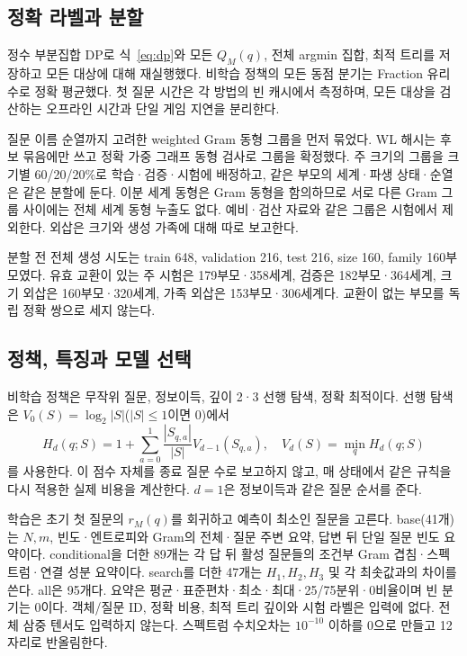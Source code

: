 \documentclass[11pt,a4paper]{article}
\theoremstyle{definition}
\theoremstyle{remark}\newtheorem{remark}[theorem]{주석}
\begin{document}
\subsection{정확 라벨과 분할}
정수 부분집합 DP로 식~\eqref{eq:dp}와 모든 $Q_M(q)$, 전체 argmin 집합, 최적 트리를 저장하고 모든 대상에 대해 재실행했다. 비학습 정책의 모든 동점 분기는 Fraction 유리수로 정확 평균했다. 첫 질문 시간은 각 방법의 빈 캐시에서 측정하며, 모든 대상을 검산하는 오프라인 시간과 단일 게임 지연을 분리한다.

질문 이름 순열까지 고려한 weighted Gram 동형 그룹을 먼저 묶었다. WL 해시는 후보 묶음에만 쓰고 정확 가중 그래프 동형 검사로 그룹을 확정했다. 주 크기의 그룹을 크기별 60/20/20\%로 학습·검증·시험에 배정하고, 같은 부모의 세계·파생 상태·순열은 같은 분할에 둔다. 이분 세계 동형은 Gram 동형을 함의하므로 서로 다른 Gram 그룹 사이에는 전체 세계 동형 누출도 없다. 예비·검산 자료와 같은 그룹은 시험에서 제외한다. 외삽은 크기와 생성 가족에 대해 따로 보고한다.

분할 전 전체 생성 시도는 train 648, validation 216, test 216, size 160, family 160부모였다. 유효 교환이 있는 주 시험은 179부모·358세계, 검증은 182부모·364세계, 크기 외삽은 160부모·320세계, 가족 외삽은 153부모·306세계다. 교환이 없는 부모를 독립 정확 쌍으로 세지 않는다.

\subsection{정책, 특징과 모델 선택}
비학습 정책은 무작위 질문, 정보이득, 깊이 2·3 선행 탐색, 정확 최적이다. 선행 탐색은 $V_0(S)=\log_2|S|$($|S|\le1$이면 0)에서
\begin{equation}
 H_d(q;S)=1+\sum_{a=0}^1\frac{|S_{q,a}|}{|S|}V_{d-1}(S_{q,a}),\quad
 V_d(S)=\min_q H_d(q;S)
\end{equation}
를 사용한다. 이 점수 자체를 종료 질문 수로 보고하지 않고, 매 상태에서 같은 규칙을 다시 적용한 실제 비용을 계산한다. $d=1$은 정보이득과 같은 질문 순서를 준다.

학습은 초기 첫 질문의 $r_M(q)$를 회귀하고 예측이 최소인 질문을 고른다. base(41개)는 $N,m$, 빈도·엔트로피와 Gram의 전체·질문 주변 요약, 답변 뒤 단일 질문 빈도 요약이다. conditional을 더한 89개는 각 답 뒤 활성 질문들의 조건부 Gram 겹침·스펙트럼·연결 성분 요약이다. search를 더한 47개는 $H_1,H_2,H_3$ 및 각 최솟값과의 차이를 쓴다. all은 95개다. 요약은 평균·표준편차·최소·최대·25/75분위·0비율이며 빈 분기는 0이다. 객체/질문 ID, 정확 비용, 최적 트리 깊이와 시험 라벨은 입력에 없다. 전체 삼중 텐서도 입력하지 않는다. 스펙트럼 수치오차는 $10^{-10}$ 이하를 0으로 만들고 12자리로 반올림한다.
\end{document}
